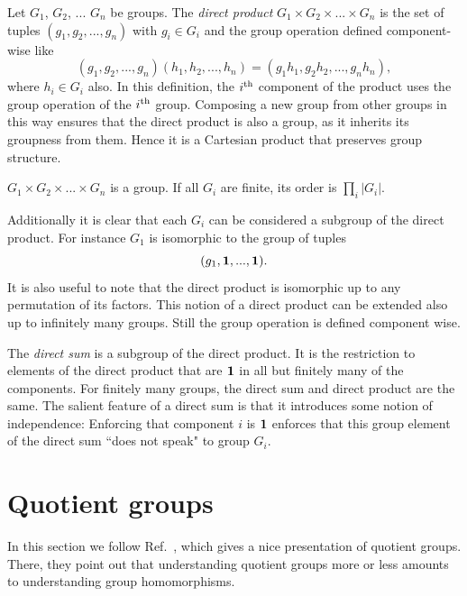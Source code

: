 Let $G_1$, $G_2$, ... $G_n$ be groups. The
{\it direct product} 
$G_1\times G_2\times ...\times G_n$
is the set of tuples $(g_1,g_2,...,g_n)$ with $g_i\in G_i$
and the group operation defined component-wise like
\begin{equation}
(g_1,g_2,...,g_n)(h_1,h_2,...,h_n)
=(g_1h_1, g_2h_2,...,g_nh_n),
\end{equation}
where $h_i\in G_i$ also.
In this definition, the $i{}^{\rm th}$ component of the product
uses the group operation of the $i{}^{\rm th}$ group. Composing
a new group from other groups in this way ensures that
the direct product is also a group, as it inherits its
groupness from them. Hence it is a Cartesian product
that preserves group structure.

\begin{proposition}{}{}
$G_1\times G_2\times ...\times G_n$ is a group.
If all $G_i$ are finite, its order is $\prod_i |G_i|$.
\end{proposition}

Additionally it is clear that each $G_i$ can be considered
a subgroup of the direct product. For instance $G_1$ is
isomorphic to the group of tuples
\begin{equation}
(g_1,{\mathbf 1},...,{\mathbf 1}).
\end{equation}
It is also useful to note that the direct product is
isomorphic up to any permutation of its factors.
This notion of a direct product can be extended also
up to infinitely many groups. Still the group operation
is defined component wise. 

The {\it direct sum} is a subgroup
of the direct product. It is the restriction to elements of
the direct product that are ${\mathbf 1}$ in all but finitely
many of the components. For finitely many groups,
the direct sum and direct product are the same. The
salient feature of a direct sum is that it introduces
some notion of independence: Enforcing that component $i$
is ${\mathbf 1}$ enforces that this group element of the
direct sum ``does not speak" to group $G_i$.


\section{Quotient groups}\label{sec:q}

In this section we follow Ref.~\cite{dummit_abstract_2004}, which gives a nice
presentation of quotient groups. There, they point out that understanding
quotient groups more or less amounts to understanding group homomorphisms.


